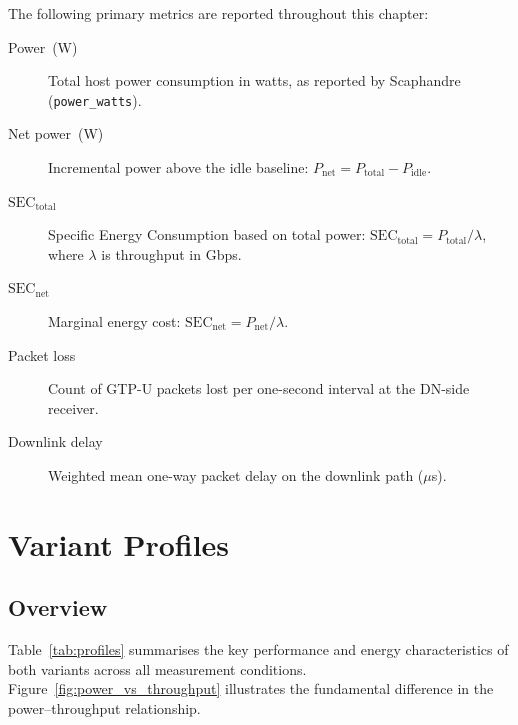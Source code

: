 \documentclass[12pt, a4paper]{report}
\newcommand{\sectable}{$\mathrm{SEC}_{\mathrm{total}}$}
\newcommand{\secnet}{$\mathrm{SEC}_{\mathrm{net}}$}
\begin{document}
The following primary metrics are reported throughout this chapter:

\begin{description}
  \item[Power~(W)] Total host power consumption in watts, as reported by
    Scaphandre (\texttt{power\_watts}).
  \item[Net power~(W)] Incremental power above the idle baseline:
    $P_{\mathrm{net}} = P_{\mathrm{total}} - P_{\mathrm{idle}}$.
  \item[\sectable{}] Specific Energy Consumption based on total power:
    $\mathrm{SEC}_{\mathrm{total}} = P_{\mathrm{total}} / \lambda$,
    where $\lambda$ is throughput in Gbps.
  \item[\secnet{}] Marginal energy cost: $\mathrm{SEC}_{\mathrm{net}}
    = P_{\mathrm{net}} / \lambda$.
  \item[Packet loss] Count of GTP-U packets lost per one-second interval
    at the DN-side receiver.
  \item[Downlink delay] Weighted mean one-way packet delay on the
    downlink path ($\mu$s).
\end{description}

\section{Variant Profiles}
\label{sec:profiles}

\subsection{Overview}

Table~\ref{tab:profiles} summarises the key performance and energy
characteristics of both variants across all measurement conditions.
Figure~\ref{fig:power_vs_throughput} illustrates the fundamental
difference in the power--throughput relationship.
\end{document}
